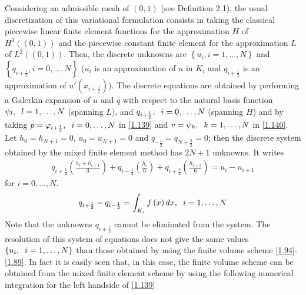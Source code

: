 \documentclass[a4paper]{article}
\numberwithin{equation}{section}
\begin{document}
Considering an admissible mesh of $\left(0,1\right)$ (see Definition 2.1), the usual discretization of this variational formulation consists in taking the classical piecewise linear finite element functions for the approximation $H$ of $H^1\left(\left(0,1\right)\right)$ and the piecewise constant finite element for the approximation $L$ of ${L^2}\left( {\left( {0,1} \right)} \right)$. Then, the discrete unknowns are $\left\{ {{u_i},i = 1, \ldots ,N} \right\}$ and $\left\{ {{q_{i + \frac{1}{2}}},i = 0, \ldots ,N} \right\}$ ($u_i$ is an approximation of $u$ in $K_i$ and ${{q_{i + \frac{1}{2}}}}$ is an approximation of ${u'}\left( {{x_{i + \frac{1}{2}}}} \right)$). The discrete equations are obtained by performing a Galerkin expansion of $u$ and $q$ with respect to the natural basis function ${\psi _l},\hspace{0.2cm} l = 1, \ldots ,N$ (spanning $L$), and  ${{q_{i + \frac{1}{2}}},\hspace{0.2cm}i = 0, \ldots ,N}$  (spanning $H$) and by taking $p = {\varphi _{i + \frac{1}{2}}},\hspace{0.2cm}i = 0, \ldots ,N$ in \eqref{1.139} and $v = {\psi _k},\hspace{0.2cm}k = 1, \ldots ,N$ in \eqref{1.140}. Let $h_0=h_{N+1}=0$, $u_0=u_{N+1}=0$ and ${q_{ - \frac{1}{2}}} = {q_{N + \frac{3}{2}}} = 0$; then the discrete system obtained by the mixed finite element method has $2N+1$ unknowns. It writes
\begin{align}
{q_{i + \frac{1}{2}}}\left( {\frac{{{h_i} + {h_{i + 1}}}}{3}} \right) + {q_{i - \frac{1}{2}}}\left( {\frac{{{h_i}}}{6}} \right) + {q_{i + \frac{3}{2}}}\left( {\frac{{{h_{i + 1}}}}{6}} \right) = {u_i} - {u_{i + 1}}
\end{align}
for $i = 0, \ldots ,N$.
\begin{align}
{q_{i + \frac{1}{2}}} - {q_{i - \frac{1}{2}}} = \int_{{K_i}} {f\left( x \right)dx} ,\hspace{0.2cm}i = 1, \ldots ,N
\end{align}
Note that the unknowns ${q_{i + \frac{1}{2}}}$ cannot be eliminated from the system. The resolution of this system of equations does not give the same values $\left\{ {{u_i},\hspace{0.2cm}i = 1, \ldots ,N} \right\}$ than those obtained by using the finite volume scheme \eqref{1.94}-\eqref{1.89}. In fact it is easily seen that, in this case, the finite volume scheme can be obtained from the mixed finite element scheme by using the following numerical integration for the left handside of \eqref{1.139} 
\end{document}
